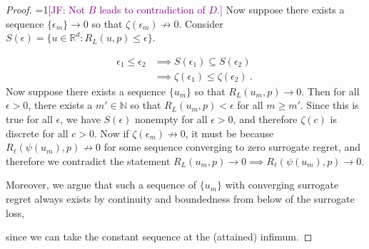 \documentclass[11pt]{article} %
\newcommand{\Comments}{1}
\newcommand{\mynote}[2]{\ifnum\Comments=1\textcolor{#1}{#2}\fi}
\newcommand{\mytodo}[2]{\ifnum\Comments=1%
	\todo[linecolor=#1!80!black,backgroundcolor=#1,bordercolor=#1!80!black]{#2}\fi}
\newcommand{\jessie}[1]{\mynote{purple}{[JF: #1]}}
\newcommand{\jessiet}[1]{\mytodo{purple!20!white}{JF: #1}}
\newcommand{\btw}[1]{}%
\newcommand{\reals}{\mathbb{R}}
\newcommand{\simplex}{\Delta_\Y}
\newcommand{\Y}{\mathcal{Y}}
\begin{document}
\begin{proof}
\jessie{Not $B$ leads to contradiction of $D$.}
Now suppose there exists a sequence $\{\epsilon_m\} \to 0$ so that $\zeta(\epsilon_m) \not \to 0$.
Consider $S(\epsilon) = \{u \in \reals^d : R_L(u,p) \leq \epsilon\}$.

\begin{align*}
\epsilon_1 \leq \epsilon_2 &\implies S(\epsilon_1) \subseteq S(\epsilon_2)\\
&\implies \zeta(\epsilon_1) \leq \zeta(\epsilon_2)~.~
\end{align*}
Now suppose there exists a sequence $\{u_m\}$ so that $R_L(u_m, p) \to 0$.
Then for all $\epsilon > 0$, there exists a $m' \in \mathbb{N}$ so that $R_L(u_m, p) < \epsilon$ for all $m \geq m'$.
Since this is true for all $\epsilon$, we have $S(\epsilon)$ nonempty for all $\epsilon > 0$, and therefore $\zeta(c)$ is discrete for all $c > 0$.
Now if $\zeta(\epsilon_m) \not \to 0$, it must be because $R_\ell(\psi(u_m), p) \not \to 0$ for some sequence converging to zero surrogate regret, and therefore we contradict the statement $R_L(u_m, p) \to 0 \implies R_\ell(\psi(u_m), p) \to 0$.

Moreover, we argue that such a sequence of $\{u_m\}$ with converging surrogate regret always exists by continuity and boundedness from below of the surrogate loss,
\btw{really just need lower semi-continuity and boundedness from below}
since we can take the constant sequence at the (attained) infimum.
%
%	
\end{proof}
\end{document}
